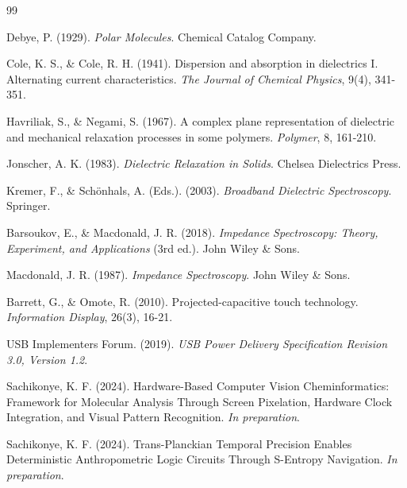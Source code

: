 \documentclass[12pt,a4paper]{article}
\begin{document}

\begin{thebibliography}{99}

Debye, P. (1929). \textit{Polar Molecules}. Chemical Catalog Company.

Cole, K. S., \& Cole, R. H. (1941). Dispersion and absorption in dielectrics I. Alternating current characteristics. \textit{The Journal of Chemical Physics}, 9(4), 341-351.

Havriliak, S., \& Negami, S. (1967). A complex plane representation of dielectric and mechanical relaxation processes in some polymers. \textit{Polymer}, 8, 161-210.

Jonscher, A. K. (1983). \textit{Dielectric Relaxation in Solids}. Chelsea Dielectrics Press.

Kremer, F., \& Schönhals, A. (Eds.). (2003). \textit{Broadband Dielectric Spectroscopy}. Springer.

Barsoukov, E., & Macdonald, J. R. (2018). \textit{Impedance Spectroscopy: Theory, Experiment, and Applications} (3rd ed.). John Wiley \& Sons.

Macdonald, J. R. (1987). \textit{Impedance Spectroscopy}. John Wiley \& Sons.

Barrett, G., & Omote, R. (2010). Projected-capacitive touch technology. \textit{Information Display}, 26(3), 16-21.

USB Implementers Forum. (2019). \textit{USB Power Delivery Specification Revision 3.0, Version 1.2}.

Sachikonye, K. F. (2024). Hardware-Based Computer Vision Cheminformatics: Framework for Molecular Analysis Through Screen Pixelation, Hardware Clock Integration, and Visual Pattern Recognition. \textit{In preparation}.

Sachikonye, K. F. (2024). Trans-Planckian Temporal Precision Enables Deterministic Anthropometric Logic Circuits Through S-Entropy Navigation. \textit{In preparation}.

\end{thebibliography}
\end{document}
